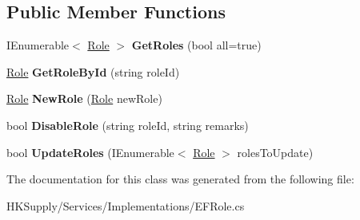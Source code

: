 \subsection*{Public Member Functions}
\begin{DoxyCompactItemize}
\item 
\mbox{\label{class_h_k_supply_1_1_services_1_1_implementations_1_1_e_f_role_a7fd2f7f9bae498128f23ad0659e3ec4a}} 
I\+Enumerable$<$ \hyperlink{class_h_k_supply_1_1_models_1_1_role}{Role} $>$ {\bfseries Get\+Roles} (bool all=true)
\item 
\mbox{\label{class_h_k_supply_1_1_services_1_1_implementations_1_1_e_f_role_ad4eb9194531a9215c4f1a20ab0d9aa54}} 
\hyperlink{class_h_k_supply_1_1_models_1_1_role}{Role} {\bfseries Get\+Role\+By\+Id} (string role\+Id)
\item 
\mbox{\label{class_h_k_supply_1_1_services_1_1_implementations_1_1_e_f_role_a549317ad8c8fb3353382a8cd36fa1b22}} 
\hyperlink{class_h_k_supply_1_1_models_1_1_role}{Role} {\bfseries New\+Role} (\hyperlink{class_h_k_supply_1_1_models_1_1_role}{Role} new\+Role)
\item 
\mbox{\label{class_h_k_supply_1_1_services_1_1_implementations_1_1_e_f_role_adf253e840ea77e23fd7c10899f316f21}} 
bool {\bfseries Disable\+Role} (string role\+Id, string remarks)
\item 
\mbox{\label{class_h_k_supply_1_1_services_1_1_implementations_1_1_e_f_role_a2d880fce95c33f7581f2e3310ca943ed}} 
bool {\bfseries Update\+Roles} (I\+Enumerable$<$ \hyperlink{class_h_k_supply_1_1_models_1_1_role}{Role} $>$ roles\+To\+Update)
\end{DoxyCompactItemize}


The documentation for this class was generated from the following file\+:\begin{DoxyCompactItemize}
\item 
H\+K\+Supply/\+Services/\+Implementations/E\+F\+Role.\+cs\end{DoxyCompactItemize}
